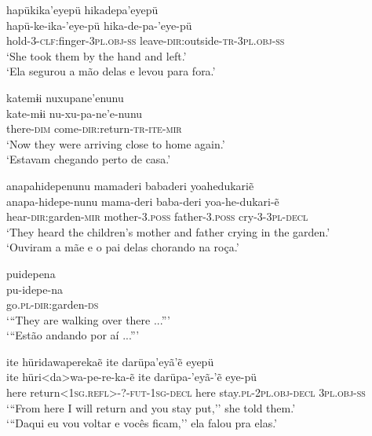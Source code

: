 \documentclass[output=paper,
modfonts,nonflat
]{langsci/langscibook}
\begin{document}
\newpage 
\ea   hapükika'eyepü hikadepa'eyepü  \\[.3em]
\gll 	 hapü-ke-ika-'eye-pü hika-de-pa-'eye-pü \\
hold-\textsc{3-clf:}finger-\textsc{3pl.obj-ss} leave-\textsc{dir:}outside-\textsc{tr-3pl.obj-ss}\\
\glt   `She took them by the hand and left.' \\
`Ela segurou a mão delas e levou para fora.'\\
\z  

\ea    katemɨi nuxupane'enunu  \\[.3em]
\gll 	kate-mɨi nu-xu-pa-ne'e-nunu\\
there-\textsc{dim} come-\textsc{dir:}return-\textsc{tr-ite-mir}\\
\glt    `Now they were arriving close to home again.' \\
`Estavam chegando perto de casa.' \\
\z  

\ea   anapahidepenunu mamaderi babaderi  yoahedukariẽ \\[.3em]
\gll 	anapa-hidepe-nunu mama-deri baba-deri  yoa-he-dukari-ẽ\\
hear-\textsc{dir:}garden-\textsc{mir} mother-\textsc{3.poss} father-\textsc{3.poss} cry-\textsc{3-3pl-decl}\\
\glt    `They heard the children's mother and father crying in the garden.' \\
`Ouviram a mãe e o pai delas chorando na roça.' \\
\z  

\ea   puidepena  \\[.3em]
\gll 	pu-idepe-na\\
go.\textsc{pl-dir:}garden-\textsc{ds}\\
\glt   `{``}They are walking over there ...{''}' \\
`{``}Estão andando por aí ...{''}'
\z  

\ea    ite hüridawaperekaẽ ite darüpa'eyã'ẽ eyepü \\[.3em]
\gll 	ite hüri<da>wa-pe-re-ka-ẽ ite darüpa-'eyã-'ẽ eye-pü\\
here return\textsc{<1sg.refl>-?-fut-1sg-decl} here stay.\textsc{pl-2pl.obj-decl} \textsc{3pl.obj-ss}\\
\glt    `{``}From here I will return and you stay put,'' she told them.' \\
`{``}Daqui eu vou voltar e vocês ficam,'' ela falou pra elas.'\\
\z  
\end{document}
